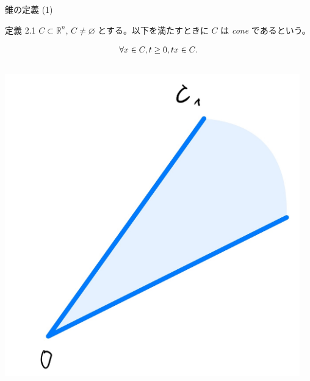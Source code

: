 \documentclass[aspectratio=169, dvipdfmx, 11pt]{beamer} %
\begin{document}
\begin{frame}{錐の定義 (1) }
  \begin{block}{定義 2.1}
    $C \subset \mathbb{R}^n$, $C \neq \varnothing$ とする。以下を満たすときに $C$ は \textit{cone} であるという。

    \begin{equation}
      \forall x \in C, t \geq 0, tx \in C. \notag
    \end{equation}

  \end{block}
  \centering
  \begin{columns}
    \begin{column}{0.31\textwidth}
      \includegraphics[keepaspectratio, scale=0.08]{figures/cone_figure_1.jpg}
    \end{column}
    \begin{column}{0.31\textwidth}

\end{column}
\end{columns}
\end{frame}
\end{document}
